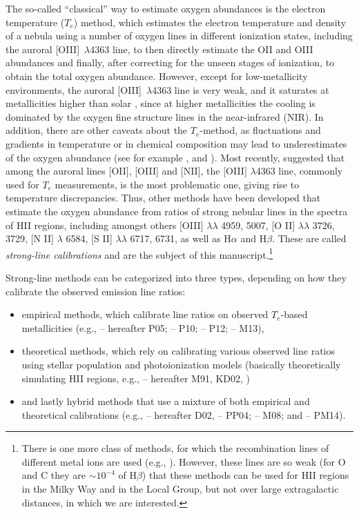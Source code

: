 \documentclass{emulateapj} \usepackage{amsmath} \usepackage{float}
\begin{document}
The so-called ``classical'' way to estimate oxygen abundances is the
electron temperature ($T_e$) method, which estimates the electron
temperature and density of a nebula using a number of oxygen lines in
different ionization states, including the auroral
[OIII]~$\lambda$4363 line, to then directly estimate the OII and OIII
abundances and finally, after correcting for the unseen stages of
ionization, to obtain the total oxygen abundance. 
%
However, except for low-metallicity environments, the auroral
[OIII]~$\lambda$4363 line is very weak, and it saturates at
metallicities higher than solar \citep{stasinska02}, since at higher
metallicities the cooling is dominated by the oxygen fine structure
lines in the near-infrared (NIR).  In addition, there are other
caveats about the $T_e$-method, as fluctuations and gradients in
temperature or in chemical composition may lead to underestimates of
the oxygen abundance (see for example \citealt{peimbert67}, and
\citealt{lopezsanchez12}).  Most recently, \citet{berg15} suggested
that among the auroral lines [OII], [OIII] and [NII], the [OIII]
$\lambda$4363 line, commonly used for $T_e$ measurements, is the most
problematic one, giving rise to temperature discrepancies.
Thus, other methods have been developed that estimate the oxygen
abundance from ratios of strong nebular lines in the spectra of HII
regions,
including amongst
others [OIII] $\lambda \lambda$ 4959, 5007, [O II] $\lambda \lambda$
3726, 3729, [N II] $\lambda$ 6584, [S II] $\lambda \lambda$ 6717, 6731, as
well as H$\alpha$ and H$\beta$. These are called \emph{strong-line calibrations}
and are the subject of this manuscript.\footnote{There is one more class of methods, for which the
  recombination lines of different metal ions are used (e.g.,
  \citealt{stasinska02,lopezsanchez12}). However, these lines are so
  weak (for O and C they are $\sim10^{-4}$ of H$\beta$) that these
  methods can be used for HII regions in the Milky Way and in the
  Local Group, but not over large extragalactic distances, in which we
  are interested.}  


Strong-line methods can be categorized into three types, depending on
how they calibrate the observed emission line ratios:
\begin{itemize}
\item{ empirical methods, which calibrate line ratios on observed
  $T_e$-based metallicities (e.g., \citealt{pilyugin05} -- hereafter
  P05; \citealt{pilyugin10} -- P10; \citealt{pilyugin12} -- P12;
  \citealt{marino13} -- M13), }
\item{ theoretical methods, which rely on calibrating various observed
  line ratios using stellar population and photoionization models
  (basically theoretically simulating HII regions, e.g.,
  \citealt{mcgaugh91} -- hereafter M91, KD02,
  \citealt{tremonti04})}
\item{ and lastly hybrid methods that use a mixture of both empirical
  and theoretical calibrations (e.g., \citealt{denicolo02} -- hereafter
  D02, \citealt{pettini04} -- PP04; \citealt{maiolino08} -- M08; and
  \citealt{perezmontero14} -- PM14).  }
\end{itemize}
\end{document}
